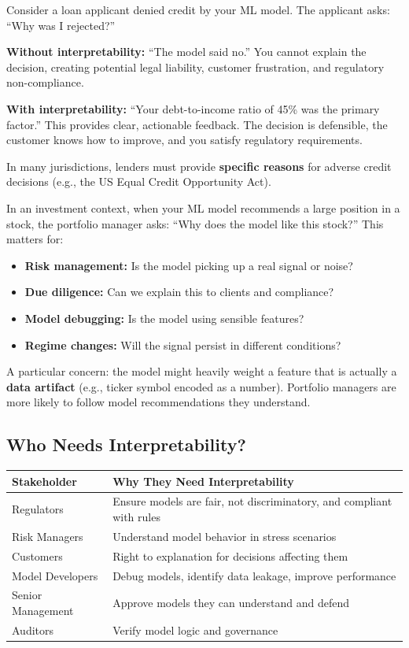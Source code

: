 \documentclass[11pt,a4paper]{article}
\newcommand{\keyword}[1]{\textbf{\textcolor{AccentOrange}{#1}}}
\begin{document}
Consider a loan applicant denied credit by your ML model. The applicant asks: ``Why was I rejected?''

\textbf{Without interpretability:} ``The model said no.'' You cannot explain the decision, creating potential legal liability, customer frustration, and regulatory non-compliance.

\textbf{With interpretability:} ``Your debt-to-income ratio of 45\% was the primary factor.'' This provides clear, actionable feedback. The decision is defensible, the customer knows how to improve, and you satisfy regulatory requirements.

In many jurisdictions, lenders must provide \keyword{specific reasons} for adverse credit decisions (e.g., the US Equal Credit Opportunity Act).

In an investment context, when your ML model recommends a large position in a stock, the portfolio manager asks: ``Why does the model like this stock?'' This matters for:
\begin{itemize}
    \item \textbf{Risk management:} Is the model picking up a real signal or noise?
    \item \textbf{Due diligence:} Can we explain this to clients and compliance?
    \item \textbf{Model debugging:} Is the model using sensible features?
    \item \textbf{Regime changes:} Will the signal persist in different conditions?
\end{itemize}

A particular concern: the model might heavily weight a feature that is actually a \keyword{data artifact} (e.g., ticker symbol encoded as a number). Portfolio managers are more likely to follow model recommendations they understand.

\subsection{Who Needs Interpretability?}

\begin{center}
\begin{tabular}{lp{8cm}}
    \toprule
    \textbf{Stakeholder} & \textbf{Why They Need Interpretability} \\
    \midrule
    Regulators & Ensure models are fair, not discriminatory, and compliant with rules \\
    Risk Managers & Understand model behavior in stress scenarios \\
    Customers & Right to explanation for decisions affecting them \\
    Model Developers & Debug models, identify data leakage, improve performance \\
    Senior Management & Approve models they can understand and defend \\
    Auditors & Verify model logic and governance \\
    \bottomrule
\end{tabular}
\end{center}
\end{document}
